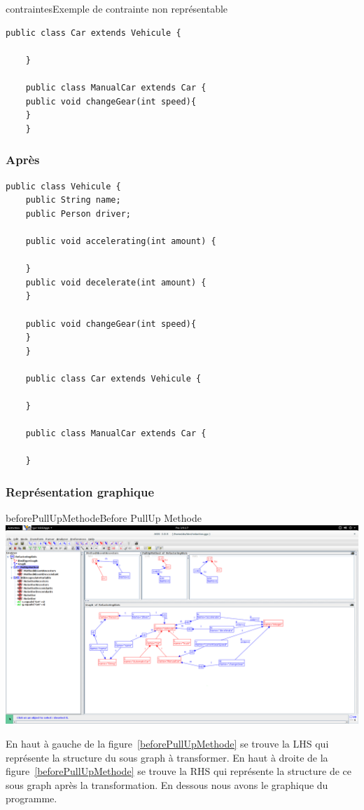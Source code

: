 \documentclass[a4paper, 12pt]{article}
\begin{document}
\begin{figu}{contraintes}{Exemple de contrainte non représentable}
\begin{lstlisting}[frame=single]
    public class Car extends Vehicule {

    }

    public class ManualCar extends Car {
    public void changeGear(int speed){
    }
    }
  \end{lstlisting}

  \subsubsection{Après}
  \begin{lstlisting}[frame=single]
    public class Vehicule {
    public String name;
    public Person driver;

    public void accelerating(int amount) {

    }
    public void decelerate(int amount) {
    }

    public void changeGear(int speed){
    }
    }

    public class Car extends Vehicule {

    }

    public class ManualCar extends Car {

    }
  \end{lstlisting}

  \subsubsection{Représentation graphique}

  \begin{myfig}{beforePullUpMethode}{Before PullUp Methode}
    \includegraphics[width=\textwidth]{beforePullUpMethode.png}
  \end{myfig}

  En haut à gauche de la figure~\ref{beforePullUpMethode} se trouve la LHS qui représente la structure du sous graph à transformer.
  En haut à droite de la figure~\ref{beforePullUpMethode} se trouve la RHS qui représente la structure de ce sous graph après la transformation.
  En dessous nous avons le graphique du programme.


\end{figu}
\end{document}
